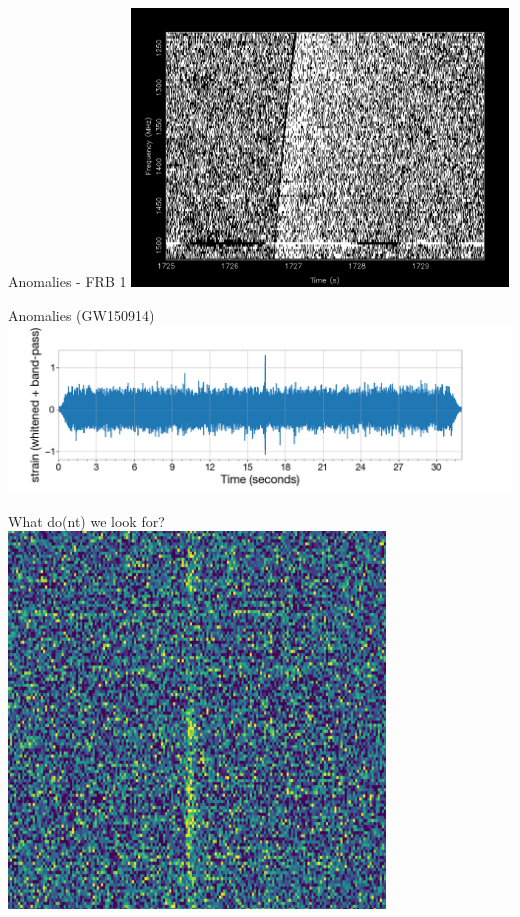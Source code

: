 \documentclass[aspectratio=169]{beamer}
\begin{document}
\begin{frame}{Anomalies - FRB 1}
  \centering
  \includegraphics[width=0.75\textwidth]{images/Frb_1.png}
\end{frame}

\begin{frame}{Anomalies (GW150914)}
  \centering
  \includegraphics[width=\textwidth]{images/gwanomaly.png}
\end{frame}

\begin{frame}{What do(nt) we look for?}
  \centering
  \includegraphics[width=0.75\textwidth]{images/frb.png}
\end{frame}
\end{document}
